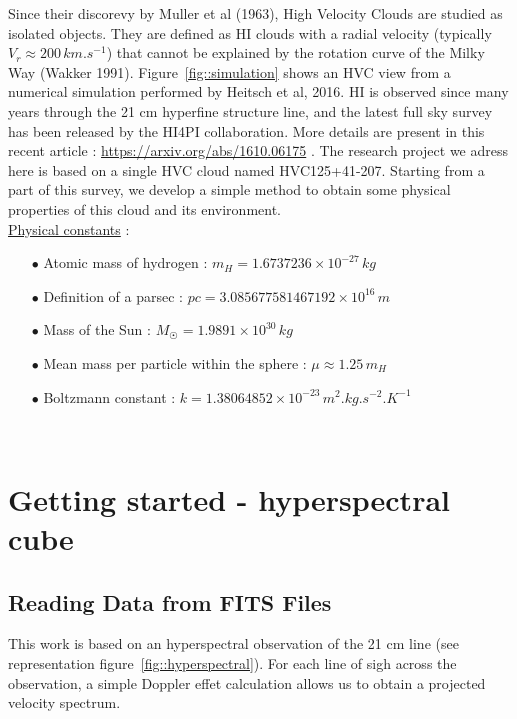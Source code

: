\documentclass[a4paper,10.5pt]{report}
\begin{document}
Since their discorevy by Muller et al (1963), High Velocity Clouds are studied as isolated objects. They are defined 
as HI clouds with a radial velocity (typically $ V_r \approx 200 \, km.s^{-1}$) that cannot be explained by the rotation 
curve of the Milky Way (Wakker 1991). Figure~\ref{fig::simulation} shows an HVC view from a numerical simulation performed by 
Heitsch et al, 2016. HI is observed since many years through the 21 cm hyperfine structure line, and the latest full sky survey 
has been released by the HI4PI collaboration. More details are present in this recent article : 
\color{blue} \url{https://arxiv.org/abs/1610.06175} \color{black}. 
The research project we adress here is based on a single HVC cloud named HVC125+41-207. 
Starting from a part of this survey, we develop a simple method to obtain some physical properties of this cloud 
and its environment. \\

\noindent
\underline{Physical constants} : \\
\begin{itemize}
\item[$\bullet$] Atomic mass of hydrogen : $m_H = 1.6737236 \times 10^{-27} \, kg$ 
\item[$\bullet$] Definition of a parsec : $pc = 3.085677581467192 \times 10^{16} \, m$
\item[$\bullet$] Mass of the Sun : $M_{\astrosun} = 1.9891 \times 10^{30} \, kg$
\item[$\bullet$] Mean mass per particle within the sphere : $\mu \approx 1.25 \, m_H$
\item[$\bullet$] Boltzmann constant : $k = 1.38064852 \times 10^{-23} \, m^2.kg.s^{-2}.K^{-1}$ 
\end{itemize} \\

\chapter{Getting started - hyperspectral cube}
\section{Reading Data from FITS Files}
This work is based on an hyperspectral observation of the 21 cm line 
(see representation figure~\ref{fig::hyperspectral}). For each line of sigh across the observation, a simple Doppler effet 
calculation allows us to obtain a projected velocity spectrum. \\
\end{document}
